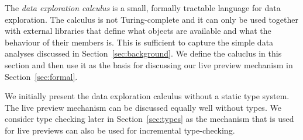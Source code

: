 \documentclass[acmsmall,anonymous,fleqn]{acmart}\settopmatter{printfolios=false,printccs=false,printacmref=false}
\theoremstyle{plain}
\theoremstyle{definition}
\begin{document}
The \emph{data exploration calculus} is a small, formally tractable language for data exploration.
The calculus is not Turing-complete and it can only be used together with external libraries that
define what objects are available and what the behaviour of their members is. This is
sufficient to capture the simple data analyses discussed in Section~\ref{sec:background}. We
define the caluclus in this section and then use it as the basis for discussing our live preview
mechanism in Section~\ref{sec:formal}.

We initially present the data exploration calculus without a static type system. The live preview
mechanism can be discussed equally well without types. We consider type checking later in
Section~\ref{sec:types} as the mechanism that is used for live previews can also be
used for incremental type-checking.

\end{document}
